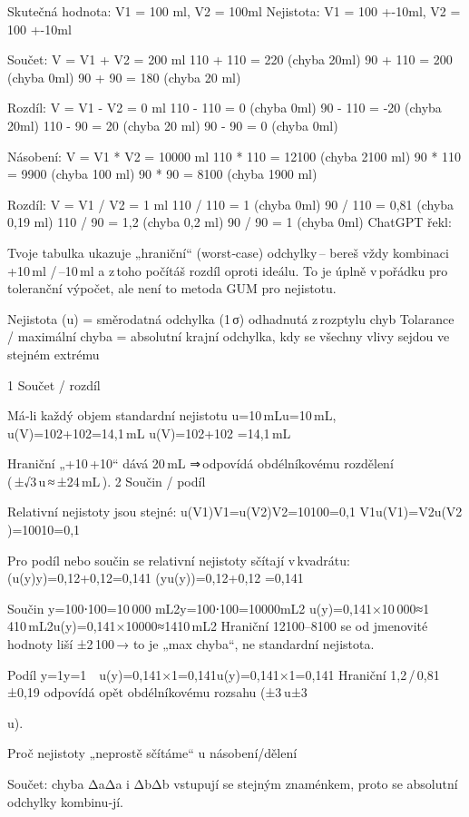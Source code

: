 {Skutečná hodnota: V1 = 100 ml, V2 = 100ml
Nejistota: V1 = 100 +-10ml, V2 = 100 +-10ml

Součet: V = V1 + V2 = 200 ml
110 + 110 = 220 (chyba 20ml)
90 + 110 = 200 (chyba 0ml)
90 + 90 = 180 (chyba 20 ml)

Rozdíl: V = V1 - V2 = 0 ml
110 - 110 = 0 (chyba 0ml)
90 - 110 = -20 (chyba 20ml)
110 - 90 = 20 (chyba 20 ml)
90 - 90 = 0 (chyba 0ml)

Násobení: V = V1 * V2 = 10000 ml
110 * 110 = 12100 (chyba 2100 ml)
90 * 110 = 9900 (chyba 100 ml)
90 * 90 = 8100 (chyba 1900 ml)

Rozdíl: V = V1 / V2 = 1 ml
110 / 110 = 1 (chyba 0ml)
90 / 110 = 0,81 (chyba 0,19 ml)
110 / 90 = 1,2 (chyba 0,2 ml)
90 / 90 = 1 (chyba 0ml)
ChatGPT řekl:

Tvoje tabulka ukazuje „hraniční“ (worst‑case) odchylky – bereš vždy kombinaci +10 ml / –10 ml a z toho počítáš rozdíl oproti ideálu. To je úplně v pořádku pro toleranční výpočet, ale není to metoda GUM pro nejistotu.

    Nejistota (u) = směrodatná odchylka (1 σ) odhadnutá z rozptylu chyb
    Tolarance / maximální chyba = absolutní krajní odchylka, kdy se všechny vlivy sejdou ve stejném extrému

1  Součet / rozdíl

Má‑li každý objem standardní nejistotu u=10 mLu=10 mL,
u(V)=102+102=14,1 mL
u(V)=102+102
​=14,1 mL

Hraniční „+10 +10“ dává 20 mL ⇒ odpovídá obdélníkovému rozdělení ( ±√3 u ≈ ±24 mL ).
2  Součin / podíl

Relativní nejistoty jsou stejné:
u(V1)V1=u(V2)V2=10100=0,1
V1​u(V1​)​=V2​u(V2​)​=10010​=0,1

Pro podíl nebo součin se relativní nejistoty sčítají v kvadrátu:
(u(y)y)=0,12+0,12=0,141
(yu(y)​)=0,12+0,12
​=0,141

    Součin y=100⋅100=10 000  mL2y=100⋅100=10000mL2
    u(y)=0,141×10 000≈1 410 mL2u(y)=0,141×10000≈1410 mL2
    Hraniční 12100–8100 se od jmenovité hodnoty liší ±2 100 → to je „max chyba“, ne standardní nejistota.

    Podíl y=1y=1 u(y)=0,141×1=0,141u(y)=0,141×1=0,141
    Hraniční 1,2 / 0,81 ±0,19 odpovídá opět obdélníkovému rozsahu (±3 u±3

    ​u).

Proč nejistoty „neprostě sčítáme“ u násobení/dělení

    Součet: chyba ΔaΔa i ΔbΔb vstupují se stejným znaménkem, proto se absolutní odchylky kombinu‑jí.

}
